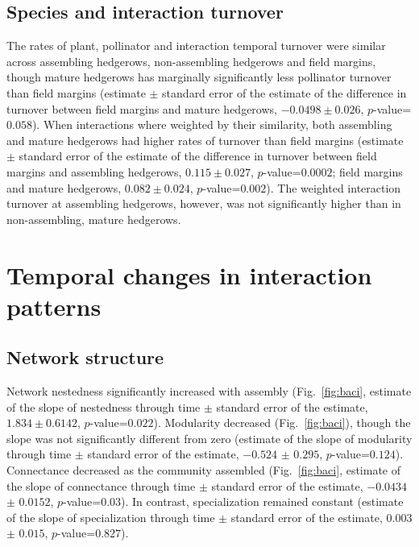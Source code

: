 \documentclass[12pt]{article}
\begin{document}
\subsection*{Species and interaction turnover}
The rates of plant, pollinator and interaction temporal turnover were
similar across assembling hedgerows, non-assembling hedgerows and
field margins, though mature hedgerows has marginally significantly
less pollinator turnover than field margins (estimate $\pm$ standard
error of the estimate of the difference in turnover between field
margins and mature hedgerows, $-0.0498 \pm 0.026$,
$p$-value=$0.058$). When interactions where weighted by their
similarity, both assembling and mature hedgerows had higher rates of
turnover than field margins (estimate $\pm$ standard error of the
estimate of the difference in turnover between field margins and
assembling hedgerows, $0.115 \pm 0.027$, $p$-value=$0.0002$; field
margins and mature hedgerows, $0.082 \pm 0.024$,
$p$-value=$0.002$). The weighted interaction turnover at assembling
hedgerows, however, was not significantly higher than in
non-assembling, mature hedgerows.


\section*{Temporal changes in interaction patterns}
\subsection*{Network structure}
Network nestedness significantly increased with assembly
(Fig.~\ref{fig:baci}, estimate of the slope of nestedness through time
$\pm$ standard error of the estimate, $1.834 \pm 0.6142$,
$p$-value=$0.022$). Modularity decreased (Fig.~\ref{fig:baci}),
though the slope was not significantly different from zero (estimate
of the slope of modularity through time $\pm$ standard error of the
estimate, $-0.524$ $\pm$ $0.295$, $p$-value=$0.124$). Connectance
decreased as the community assembled (Fig.~\ref{fig:baci}, estimate of
the slope of connectance through time $\pm$ standard error of the
estimate, $-0.0434$ $\pm$ $0.0152$, $p$-value=$0.03$). In contrast,
specialization remained constant (estimate of the slope of
specialization through time $\pm$ standard error of the estimate,
$0.003$ $\pm$ $0.015$, $p$-value=$0.827$).
\end{document}
